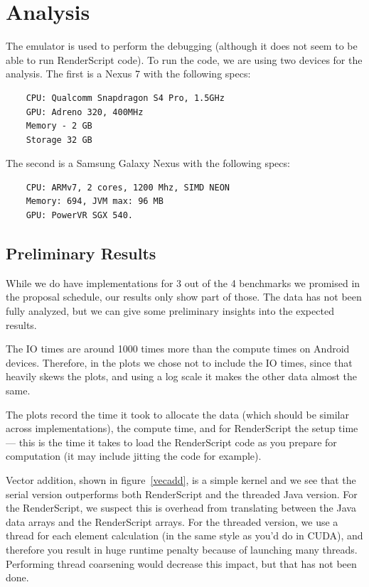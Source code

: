 \section*{Analysis}
\label{sec:analysis}

The emulator is used to perform the debugging (although it does not seem to be able to run RenderScript code).
To run the code, we are using two devices for the analysis.
The first is a Nexus 7 with the following specs:

\begin{verbatim}
    CPU: Qualcomm Snapdragon S4 Pro, 1.5GHz
    GPU: Adreno 320, 400MHz
    Memory - 2 GB
    Storage 32 GB
\end{verbatim}

The second is a Samsung Galaxy Nexus with the following specs:

\begin{verbatim}
    CPU: ARMv7, 2 cores, 1200 Mhz, SIMD NEON
    Memory: 694, JVM max: 96 MB
    GPU: PowerVR SGX 540.
\end{verbatim}


\subsection*{Preliminary Results}

While we do have implementations for 3 out of the 4 benchmarks we promised in the proposal schedule,
  our results only show part of those.
The data has not been fully analyzed, but we can give some preliminary insights into the expected
  results.

The IO times are around 1000 times more than the compute times on Android devices.
Therefore, in the plots we chose not to include the IO times, since that heavily skews
  the plots, and using a log scale it makes the other data almost the same.

The plots record the time it took to allocate the data (which should be similar across implementations),
  the compute time, and for RenderScript the setup time --- this is the time it takes to load the RenderScript code as you prepare for computation (it may include jitting the code for example).

Vector addition, shown in figure~\ref{vecadd}, is a simple kernel and we see that the serial version outperforms both RenderScript
  and the threaded Java version.
For the RenderScript, we suspect this is overhead from translating between the Java data arrays and
  the RenderScript arrays.
For the threaded version, we use a thread for each element calculation (in the same style as you'd do in CUDA), and therefore you result in huge runtime penalty because of launching many threads.
Performing thread coarsening would decrease this impact, but that has not been done. 

